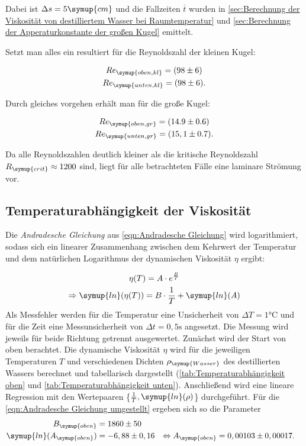 Dabei ist $\Delta s=5\symup{cm}$ und die Fallzeiten $\overline{t}$ wurden in
\autoref{sec:Berechnung der Viskosität von destilliertem Wasser bei Raumtemperatur} und
\autoref{sec:Berechnung der Apperaturkonstante der großen Kugel} emittelt.

Setzt man alles ein resultiert für die Reynoldszahl der kleinen Kugel:

\begin{gather}
  Re_{\symup{oben,kl}} = (98\pm6) \notag \\
  Re_{\symup{unten,kl}} = (98\pm6) \notag .
\end{gather}

Durch gleiches vorgehen erhält man für die große Kugel:

\begin{gather}
  Re_{\symup{oben,gr}} = (14.9\pm0.6) \notag \\
  Re_{\symup{unten,gr}} = (15,1\pm0.7) \notag .
\end{gather}

Da alle Reynoldszahlen deutlich kleiner als die kritische Reynoldszahl $R_{\symup{crit}}\approx 1200$ sind, liegt für alle 
betrachteten Fälle eine laminare Strömung vor.

\subsection{Temperaturabhängigkeit der Viskosität}
\label{sec:Temperaturabhängigkeit der Viskosität}
Die \textit{Andradesche Gleichung} aus \autoref{eqn:Andradesche Gleichung} wird logarithmiert, sodass sich ein linearer Zusammenhang
zwischen dem Kehrwert der Temperatur und dem natürlichen Logarithmus der dynamischen Viskosität $\eta$ ergibt:

\begin{gather}
  \eta (T)=A\cdot e^{\frac{B}{T}} \\
  \Rightarrow \symup{ln}(\eta(T)) = B \cdot \frac{1}{T} + \symup{ln}(A) \label{eqn:Andradesche Gleichung umgestellt}
\end{gather}
Als Messfehler werden für die Temperatur eine Unsicherheit von $\Delta T = 1 \unit{\celsius}$ und für die Zeit 
eine Messunsicherheit von $\Delta t = 0,5 \unit{\second}$ angesetzt.
Die Messung wird jeweils für beide Richtung getrennt ausgewertet. Zunächst wird der Start von oben berachtet.
Die dynamische Viskosität $\eta$ wird für die jeweiligen Temperaturen $T$ und verschiedenen Dichten $\rho_{\symup{Wasser}}$ 
des destillierten Wassers berechnet und tabellarisch dargestellt (\autoref{tab:Temperaturabhängigkeit oben} 
und \autoref{tab:Temperaturabhängigkeit unten}). Anschließend wird eine lineare Regression mit den Wertepaaren 
\{$\frac{1}{T}, \symup{ln}(\rho)$\} durchgeführt. Für die \autoref{eqn:Andradesche Gleichung umgestellt} ergeben sich so die Parameter
\begin{align}
  B_{\symup{oben}}&=1860\pm50 \\
  \symup{ln}(A_{\symup{oben}}) &= -6,88\pm0,16 &\Leftrightarrow A_{\symup{oben}}&=0,00103\pm0,00017 .
\end{align}


